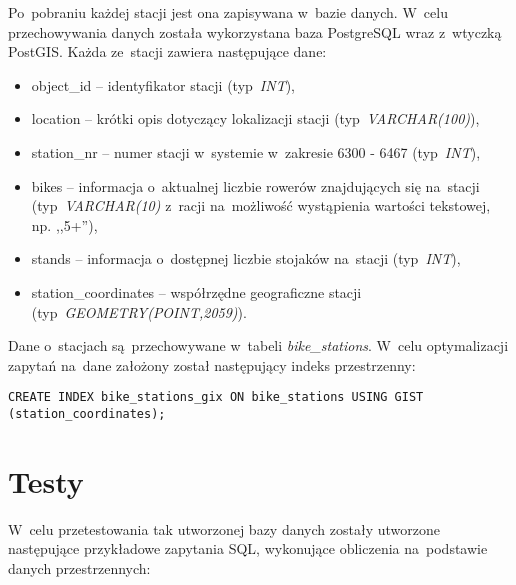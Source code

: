 \documentclass[11pt,a4paper]{article}
\begin{document}
\newpage
Po~pobraniu każdej stacji jest ona zapisywana w~bazie danych. W~celu przechowywania danych została wykorzystana baza PostgreSQL wraz z~wtyczką PostGIS. Każda ze~stacji zawiera następujące dane:
\begin{itemize}
  \item object\_id -- identyfikator stacji (typ~\emph{INT}),
  \item location -- krótki opis dotyczący lokalizacji stacji (typ~\emph{VARCHAR(100)}),
  \item station\_nr -- numer stacji w~systemie w~zakresie 6300 - 6467 (typ~\emph{INT}),
  \item bikes -- informacja o~aktualnej liczbie rowerów znajdujących się na~stacji (typ~\emph{VARCHAR(10)} z~racji na~możliwość wystąpienia wartości tekstowej, np. ,,5+''),
  \item stands -- informacja o~dostępnej liczbie stojaków na~stacji (typ~\emph{INT}),
  \item station\_coordinates -- współrzędne geograficzne stacji (typ~\emph{GEOMETRY(POINT,2059)}).
\end{itemize}

Dane o~stacjach są~przechowywane w~tabeli \emph{bike\_stations}. W~celu optymalizacji zapytań na~dane założony został następujący indeks przestrzenny:

\begin{lstlisting}[caption=Indeks przestrzenny założony na~danych w~tabeli.]
  CREATE INDEX bike_stations_gix ON bike_stations USING GIST (station_coordinates);
\end{lstlisting}

\section{Testy}
W~celu przetestowania tak utworzonej bazy danych zostały utworzone następujące przykładowe zapytania SQL, wykonujące obliczenia na~podstawie danych przestrzennych:
\end{document}
